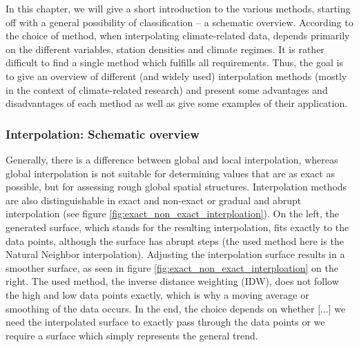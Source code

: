 In this chapter, we will give a short introduction to the various methods, starting off with a general possibility of classification – a schematic overview. According to  the choice of method, when interpolating climate-related data, depends primarily on the different variables, station densities and climate regimes. It is rather difficult to find a single method which fulfills all requirements. Thus, the goal is to give an overview of different (and widely used) interpolation methods (mostly in the context of climate-related research) and present some advantages and disadvantages of each method as well as give some examples of their application.

\subsubsection{Interpolation: Schematic overview}

Generally, there is a difference between global and local interpolation, whereas global interpolation is not suitable for determining values ​​that are as exact as possible, but for assessing rough global spatial structures. \cite{gitta_raumliche_2016}
Interpolation methods are also distinguishable in exact and non-exact or gradual and abrupt interpolation (see figure \ref{fig:exact_non_exact_interploation}). On the left, the generated surface, which stands for the resulting interpolation, fits exactly to the data points, although the surface has abrupt  \ldq{}steps\rdq{} (the used method here is the Natural Neighbor interpolation). Adjusting the interpolation surface results in a smoother surface, as seen in figure \ref{fig:exact_non_exact_interploation} on the right.
The used method, the inverse distance weighting (IDW), does not follow the high and low data points exactly, which is why a \ldq{}moving average\rdq{} or \ldq{}smoothing\rdq{} of the data occurs. In the end, the choice depends on whether  \ldq{}[...] we need the interpolated surface to exactly pass through the data points or we require a surface which simply represents the general trend\rdq{}. %



